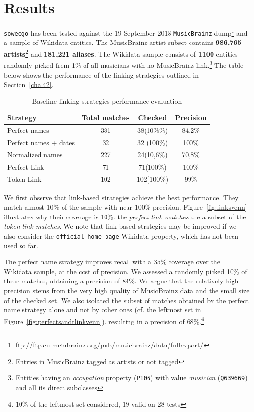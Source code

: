 \clearpage
\newpage

\chapter{Results}
\label{cha:5}
\texttt{soweego} has been tested against the 19 September 2018 \texttt{MusicBrainz} dump\footnote{\url{ftp://ftp.eu.metabrainz.org/pub/musicbrainz/data/fullexport/}} and a sample of Wikidata entities.
The MusicBrainz artist subset contains \textbf{986,765 artists}\footnote{Entries in MusicBrainz tagged as artists or not tagged} and \textbf{181,221 aliases}. The Wikidata sample consists of \textbf{1100} entities randomly picked from 1\% of all musicians with no MusicBrainz link.\footnote{Entities having an \textit{occupation} property (\texttt{P106}) with value \textit{musician} (\texttt{Q639669}) and all its direct subclasses}
The table below shows the performance of the linking strategies outlined in Section~\ref{cha:42}.

\begin{table}[h]
    \centering
    \caption{Baseline linking strategies performance evaluation}
    \begin{tabular}{| l | c | c | c |}
        \hline
        \textbf{Strategy} & \textbf{Total matches} & \textbf{Checked} & \textbf{Precision} \\ \hline
        Perfect names & 381 & 38(10\%\%) & 84,2\%\\ \hline
        Perfect names + dates & 32 & 32 (100\%) & 100\%\\ \hline
        Normalized names & 227 & 24(10,6\%) & 70,8\%\\ \hline
        Perfect Link & 71 & 71(100\%) & 100\% \\ \hline
        Token Link & 102 & 102(100\%) & 99\%\\ \hline
    \end{tabular}
\end{table}

We first observe that link-based strategies achieve the best performance. They match almost 10\% of the sample with near 100\% precision. Figure~\ref{fig:linksvenn} illustrates why their coverage is 10\%: the \textit{perfect link matches} are a subset of the \textit{token link matches}.
We note that link-based strategies may be improved if we also consider the \texttt{official home page} Wikidata property, which has not been used so far.

The perfect name strategy improves recall with a 35\% coverage over the Wikidata sample, at the cost of precision. We assessed a randomly picked 10\% of these matches, obtaining a precision of 84\%. We argue that the relatively high precision stems from the very high quality of MusicBrainz data and the small size of the checked set.
We also isolated the subset of matches obtained by the perfect name strategy alone and not by other ones (cf. the leftmost set in Figure~\ref{fig:perfectsandtlinkvenn}), resulting in a precision of 68\%.\footnote{10\% of the leftmost set considered, 19 valid on 28 tests}


